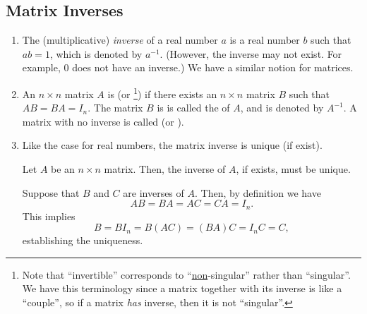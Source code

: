 \subsection{Matrix Inverses}
\label{subsect:matrix-inv}
\begin{enumerate}
\item The (multiplicative) \emph{inverse} of a real number \(a\) is a real
number \(b\) such that \(ab=1\), which is denoted by \(a^{-1}\). (However, the
inverse may not exist. For example, \(0\) does not have an inverse.) We have a
similar notion for matrices.

\item An \(n\times n\) matrix \(A\) is  (or
\footnote{Note that ``invertible'' corresponds to
``\underline{non}-singular'' rather than ``singular''. We have this terminology
since a matrix together with its inverse is like a ``couple'', so if a matrix
\emph{has} inverse, then it is not ``singular''.}) if there exists an \(n\times
n\) matrix \(B\) such that \(AB=BA=I_n\).  The matrix \(B\) is is called the
 of \(A\), and is denoted by \(A^{-1}\). A matrix with no inverse
is called  (or ).


\item Like the case for real numbers, the matrix inverse is unique (if exist).
\begin{proposition}
\label{prp:matrix-inv-unique}
Let \(A\) be an \(n\times n\) matrix. Then, the inverse of \(A\), if exists,
must be unique.
\end{proposition}
\begin{pf}
Suppose that \(B\) and \(C\) are inverses of \(A\). Then, by definition we have
\[
AB=BA=AC=CA=I_n.
\]
This implies
\[
B=BI_n=B(AC)=(BA)C=I_nC=C,
\]
establishing the uniqueness.
\end{pf}


\end{enumerate}
